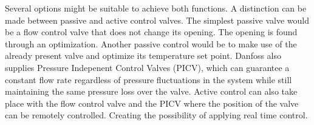 

Several options might be suitable to achieve both functions. A distinction can be made between passive and active control valves. The simplest passive valve would be a flow control valve that does not change its opening. The opening is found through an optimization. Another passive control would be to make use of the already present valve and optimize its temperature set point. Danfoss also supplies Pressure Indepenent Control Valves (PICV), which can guarantee a constant flow rate regardless of pressure fluctuations in the system while still maintaining the same pressure loss over the valve. Active control can also take place with the flow control valve and the PICV where the position of the valve can be remotely controlled. Creating the possibility of applying real time control.  